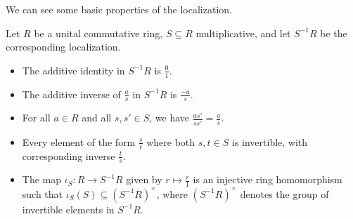 \documentclass[10pt]{mypackage}
\begin{document}
We can see some basic properties of the localization. 
\begin{proposition}
  Let $R$ be a unital commutative ring, $S\subseteq R$ multiplicative, and let $S^{-1}R$ be the corresponding localization.
  \begin{itemize}
    \item The additive identity in $S^{-1}R$ is $\frac{0}{1}$.
    \item The additive inverse of $ \frac{a}{s} $ in $S^{-1}R$ is $\frac{-a}{s}$.
    \item For all $a\in R$ and all $s,s'\in S$, we have $ \frac{as'}{ss'} = \frac{a}{s} $.
    \item Every element of the form $ \frac{s}{t} $ where both $s,t\in S$ is invertible, with corresponding inverse $ \frac{t}{s} $.
    \item The map $\iota_S\colon R\rightarrow S^{-1}R$ given by $ r\mapsto \frac{r}{1} $ is an injective ring homomorphism such that $\iota_S\left( S \right)\subseteq \left( S^{-1}R \right)^{\times}$, where $\left( S^{-1}R \right)^{\times}$ denotes the group of invertible elements in $S^{-1}R$.
  \end{itemize}
\end{proposition}
\end{document}
